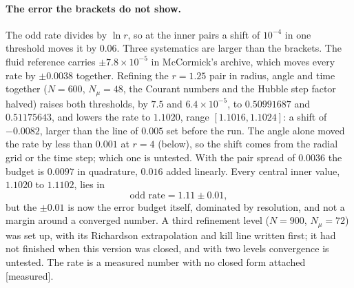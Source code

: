 \documentclass[11pt]{article}
\newcommand{\grade}[1]{\textsf{\small[#1]}}
\begin{document}
\paragraph{The error the brackets do not show.} The odd rate divides by $\ln r$, so at the inner pairs a shift of $10^{-4}$ in one threshold moves it by $0.06$. Three systematics are larger than the brackets. The fluid reference carries $\pm7.8\times10^{-5}$ in McCormick's archive, which moves every rate by $\pm0.0038$ together. Refining the $r=1.25$ pair in radius, angle and time together ($N=600$, $N_\mu=48$, the Courant numbers and the Hubble step factor halved) raises both thresholds, by $7.5$ and $6.4\times10^{-5}$, to $0.50991687$ and $0.51175643$, and lowers the rate to $1.1020$, range $[1.1016,1.1024]$: a shift of $-0.0082$, larger than the line of $0.005$ set before the run. The angle alone moved the rate by less than $0.001$ at $r=4$ (below), so the shift comes from the radial grid or the time step; which one is untested. With the pair spread of $0.0036$ the budget is $0.0097$ in quadrature, $0.016$ added linearly. Every central inner value, $1.1020$ to $1.1102$, lies in
\begin{equation}
\text{odd rate}=1.11\pm0.01,
\end{equation}
but the $\pm0.01$ is now the error budget itself, dominated by resolution, and not a margin around a converged number. A third refinement level ($N=900$, $N_\mu=72$) was set up, with its Richardson extrapolation and kill line written first; it had not finished when this version was closed, and with two levels convergence is untested. The rate is a measured number with no closed form attached \grade{measured}.
\end{document}
